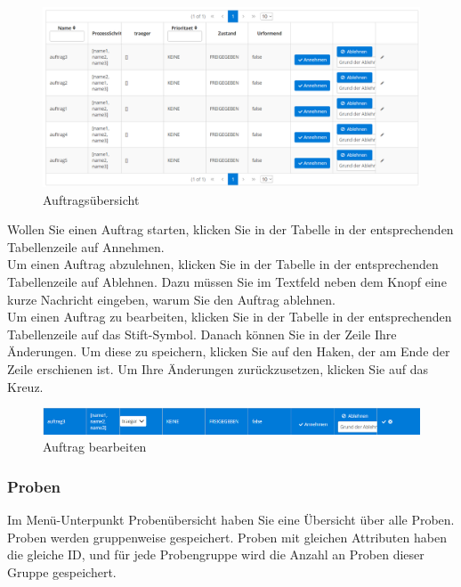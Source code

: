 \documentclass[enabledeprecatedfontcommands,fontsize=12pt,paper=a4,twoside]{scrartcl}
\begin{document}
\begin{figure}[h!]
\begin{center}
 \includegraphics[width=\textwidth]{screenshots/l/auftrage.png}
  \caption{Auftragsübersicht}
  \label{fig:boat1}
\end{center}
\end{figure}

Wollen Sie einen Auftrag starten, klicken Sie in der Tabelle in der entsprechenden Tabellenzeile auf Annehmen. \\

Um einen Auftrag abzulehnen, klicken Sie in der Tabelle in der entsprechenden Tabellenzeile auf Ablehnen. Dazu müssen Sie im Textfeld neben dem Knopf eine kurze Nachricht eingeben, warum Sie den Auftrag ablehnen. \\

Um einen Auftrag zu bearbeiten, klicken Sie in der Tabelle in der entsprechenden Tabellenzeile auf das Stift-Symbol. Danach können Sie in der Zeile Ihre Änderungen. Um diese zu speichern, klicken Sie auf den Haken, der am Ende der Zeile erschienen ist. Um Ihre Änderungen zurückzusetzen, klicken Sie auf das Kreuz. \\

\begin{figure}[h!]
\begin{center}
 \includegraphics[width=\textwidth]{screenshots/l/auftragedit.png}
  \caption{Auftrag bearbeiten}
  \label{fig:boat1}
\end{center}
\end{figure}

\subsubsection{Proben}
Im Menü-Unterpunkt Probenübersicht haben Sie eine Übersicht über alle Proben. \\
Proben werden gruppenweise gespeichert. Proben mit gleichen Attributen haben die gleiche ID, und für jede Probengruppe wird die Anzahl an Proben dieser Gruppe gespeichert. \\
\end{document}
